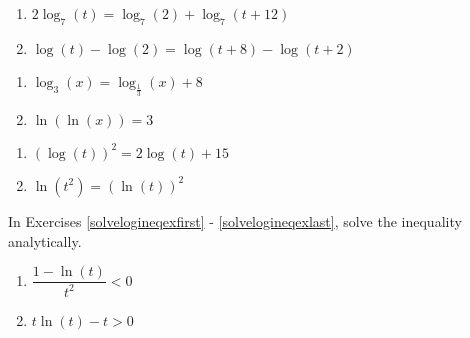 \documentclass{ximera}
\begin{document}
\begin{multicols}{2}
\begin{enumerate}
\setcounter{enumi}{\value{HW}}

\item $2\log_{7}(t) = \log_{7}(2) + \log_{7}(t+12)$

\item $\log(t) - \log(2) = \log(t+8)  - \log(t+2)$

\setcounter{HW}{\value{enumi}}
\end{enumerate}
\end{multicols}

\begin{multicols}{2}
\begin{enumerate}
\setcounter{enumi}{\value{HW}}

\item $\log_{3}(x) = \log_{\frac{1}{3}}(x) + 8$

\item $\ln(\ln(x)) = 3$

\setcounter{HW}{\value{enumi}}
\end{enumerate}
\end{multicols}

\begin{multicols}{2}
\begin{enumerate}
\setcounter{enumi}{\value{HW}}

\item $\left(\log(t)\right)^2=2\log(t)+15$

\item $\ln(t^{2}) = (\ln(t))^{2}$ \label{solvelogeqexlast}

\setcounter{HW}{\value{enumi}}
\end{enumerate}
\end{multicols}


In Exercises \ref{solvelogineqexfirst} - \ref{solvelogineqexlast}, solve the inequality analytically.

\begin{multicols}{2}
\begin{enumerate}
\setcounter{enumi}{\value{HW}}

\item $\dfrac{1 - \ln(t)}{t^{2}} < 0$ \label{solvelogineqexfirst}
\item $t\ln(t) - t > 0$   


\setcounter{HW}{\value{enumi}}
\end{enumerate}
\end{multicols}
\end{document}
